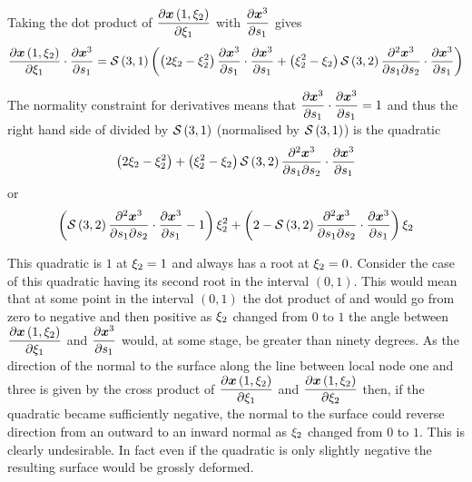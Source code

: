 Taking the dot product of $\delby{\fnof{\vect{x}}{1,\xitwo}}{\xione}$ with 
$\delby{\nodept{\vect{x}}{3}}{s_{1}}$ gives
\begin{equation}
  \dotprod{\delby{\fnof{\vect{x}}{1,\xitwo}}{\xione}}{\delby{\nodept{\vect{x}}{3}}
    {s_{1}}} = \nsftwo{3}{1}
  \pbrac{\pbrac{2\xitwo-\xitwo^{2}}\dotprod{\delby{\nodept{\vect{x}}{3}}{s_{1}}}
    {\delby{\nodept{\vect{x}}{3}}{s_{1}}}+\pbrac{\xitwo^{2}-\xitwo}\nsftwo{3}{2}
    \dotprod{\deltwoby{\nodept{\vect{x}}{3}}{s_{1}}{s_{2}}}
    {\delby{\nodept{\vect{x}}{3}}{s_{1}}}}
  \label{eqn:hsonedirectiondotprod}
\end{equation}

The normality constraint for \arclen derivatives means that
$\dotprod{\delby{\nodept{\vect{x}}{3}}{s_{1}}}{\delby{\nodept{\vect{x}}{3}}
  {s_{1}}}=1$ and thus the right hand side of
 divided by $   \mathcal{S} \left( 3,1 \right)  $ (\ie normalised
by $   \mathcal{S} \left( 3,1 \right)  $) is the quadratic
\begin{equation*}
  \pbrac{2\xitwo-\xitwo^{2}}+\pbrac{\xitwo^{2}-\xitwo}\nsftwo{3}{2}
  \dotprod{\deltwoby{\nodept{\vect{x}}{3}}{s_{1}}{s_{2}}}{\delby{\nodept{\vect{x}}
      {3}}{s_{1}}} 
\end{equation*}
or
\begin{equation*}
  \pbrac{\nsftwo{3}{2}\dotprod{\deltwoby{\nodept{\vect{x}}{3}}{s_{1}}{s_{2}}}
    {\delby{\nodept{\vect{x}}{3}}{s_{1}}} -1}\xitwo^{2}+
  \pbrac{2-\nsftwo{3}{2}\dotprod{\deltwoby{\nodept{\vect{x}}{3}}{s_{1}}{s_{2}}}
    {\delby{\nodept{\vect{x}}{3}}{s_{1}}}}\xitwo
  \label{eqn:hsonedirectionpolynomial}
\end{equation*}

This quadratic is $1$ at $\xi_{2}=1$ and always has a root at $\xi_{2}=0$.
Consider the case of this quadratic having its second root in the interval
$(0,1)$. This would mean that at some point in the interval $(0,1)$ the dot
product of  and
 would go from zero to negative and then
positive as $\xi_{2}$ changed from $0$ to $1$ \ie the angle between
$\delby{\fnof{\vect{x}}{1,\xitwo}}{\xione}$ and
$\delby{\nodept{\vect{x}}{3}}{s_{1}}$ would, at some stage, be greater than
ninety degrees. As the direction of the normal to the surface along the line
between local node one and three is given by the cross product of
$\delby{\fnof{\vect{x}}{1,\xitwo}}{\xione}$ and
$\delby{\fnof{\vect{x}}{1,\xitwo}}{\xitwo}$ then, if the quadratic became
sufficiently negative, the normal to the surface could reverse direction from
an outward to an inward normal as $\xi_{2}$ changed from $0$ to $1$. This is
clearly undesirable. In fact even if the quadratic is only slightly negative
the resulting surface would be grossly deformed.

